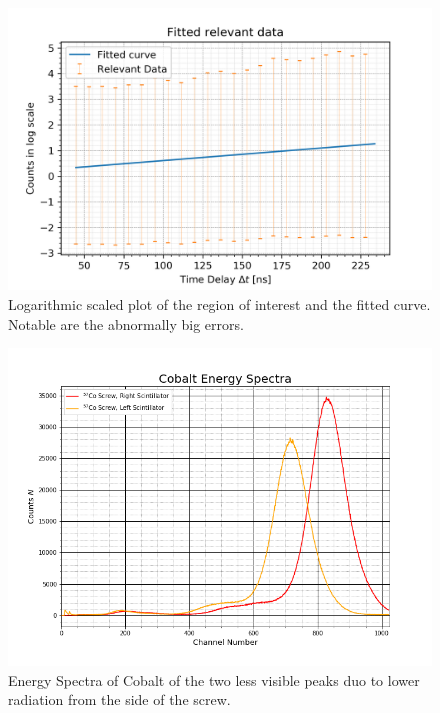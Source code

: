 \documentclass[30pt,a4paper]{article}
\begin{document}
 	\begin{figure}[h]
 	\includegraphics{Bilder/log_relevant_fit}
 	\centering
 	\caption[Logarithmic Plot]{\small Logarithmic scaled plot of the region of interest and the fitted 
 	curve. Notable are the abnormally big errors.}
 	\label{log_relevant_fit}
	\end{figure}
	\begin{figure}[h]
		\includegraphics[scale=0.5]{Bilder/Cobalt_Energy_Spectra2}
		\centering
		\caption[Cobalt Spectrum less visible Peaks]{Energy Spectra of Cobalt of the two less visible peaks duo to lower radiation from the side of the screw.}
		\label{2cobaltspectra}
	\end{figure}
\end{document}
